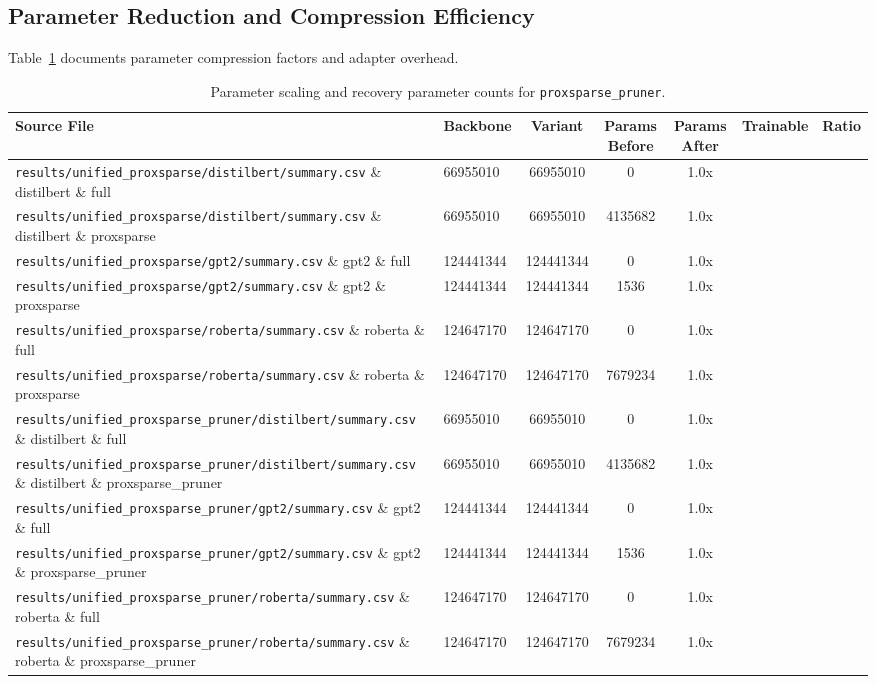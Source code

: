 \subsection{Parameter Reduction and Compression Efficiency}
Table~\ref{tab:results_params_proxsparse_pruner} documents parameter compression factors and adapter overhead.

\begin{table}[t]
\centering
\small
\begin{tabularx}{\linewidth}{llccccc}
\toprule
\textbf{Source File} & \textbf{Backbone} & \textbf{Variant} & \textbf{Params Before} & \textbf{Params After} & \textbf{Trainable} & \textbf{Ratio} \\
\midrule
\texttt{results/unified\_proxsparse/distilbert/summary.csv} \& distilbert \& full & 66955010 & 66955010 & 0 & 1.0x \\
\texttt{results/unified\_proxsparse/distilbert/summary.csv} \& distilbert \& proxsparse & 66955010 & 66955010 & 4135682 & 1.0x \\
\texttt{results/unified\_proxsparse/gpt2/summary.csv} \& gpt2 \& full & 124441344 & 124441344 & 0 & 1.0x \\
\texttt{results/unified\_proxsparse/gpt2/summary.csv} \& gpt2 \& proxsparse & 124441344 & 124441344 & 1536 & 1.0x \\
\texttt{results/unified\_proxsparse/roberta/summary.csv} \& roberta \& full & 124647170 & 124647170 & 0 & 1.0x \\
\texttt{results/unified\_proxsparse/roberta/summary.csv} \& roberta \& proxsparse & 124647170 & 124647170 & 7679234 & 1.0x \\
\texttt{results/unified\_proxsparse\_pruner/distilbert/summary.csv} \& distilbert \& full & 66955010 & 66955010 & 0 & 1.0x \\
\texttt{results/unified\_proxsparse\_pruner/distilbert/summary.csv} \& distilbert \& proxsparse\_pruner & 66955010 & 66955010 & 4135682 & 1.0x \\
\texttt{results/unified\_proxsparse\_pruner/gpt2/summary.csv} \& gpt2 \& full & 124441344 & 124441344 & 0 & 1.0x \\
\texttt{results/unified\_proxsparse\_pruner/gpt2/summary.csv} \& gpt2 \& proxsparse\_pruner & 124441344 & 124441344 & 1536 & 1.0x \\
\texttt{results/unified\_proxsparse\_pruner/roberta/summary.csv} \& roberta \& full & 124647170 & 124647170 & 0 & 1.0x \\
\texttt{results/unified\_proxsparse\_pruner/roberta/summary.csv} \& roberta \& proxsparse\_pruner & 124647170 & 124647170 & 7679234 & 1.0x \\
\bottomrule
\end{tabularx}
\caption{Parameter scaling and recovery parameter counts for \texttt{proxsparse\_pruner}.}
\label{tab:results_params_proxsparse_pruner}
\end{table}

